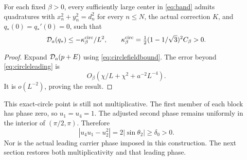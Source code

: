 \begin{theorem}\label{thm:circles}
For each fixed \(\beta>0\), every sufficiently large center in
\eqref{eq:band} admits quadratures with
\(x_n^2+y_n^2=d_n^2\) for every \(n\le N\), the actual correction \(K\),
and \(q_*(0)=q_*'(0)=0\), such that
\begin{equation}\label{eq:circlenegative}
 \mathcal D_a(q_*)\le-\kappa_\beta^{\rm circ}/L^2,\qquad
 \kappa_\beta^{\rm circ}=\tfrac12(1-1/\sqrt3)^2C_\beta>0.
\end{equation}
\end{theorem}
\begin{proof}
Expand \(\mathcal D_a(p+E)\) using \eqref{eq:circlefieldbound}.
The error beyond \eqref{eq:circleleading} is
\[
 O_\beta(\chi/L+\chi^2+a^{-2}L^{-4}).
\]
It is \(o(L^{-2})\), proving the result.
\end{proof}

This exact-circle point is still not multiplicative. The first member
of each block has phase zero, so \(u_1=u_4=1\). The adjusted second
phase remains uniformly in the interior of \((\pi/2,\pi)\). Therefore
\[
 |u_4u_1-u_2^2|=2|\sin\theta_2|\ge\delta_0>0.
\]
Nor is the actual leading carrier phase imposed in this construction.
The next section restores both multiplicativity and that leading phase.
